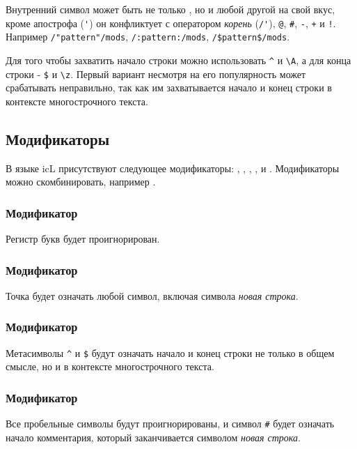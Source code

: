 \documentclass[a4paper, 14pt]{extarticle}
\begin{document}
Внутренний символ может быть не только \code{/}, но и любой другой на свой вкус, кроме апострофа (\lstinline|'|) он конфликтует с оператором {\it корень} (\lstinline|/'|), \lstinline|@|, \lstinline|#|, \lstinline|-|, \lstinline|+| и \lstinline|!|. Например  \lstinline|/"pattern"/mods|, \lstinline|/:pattern:/mods|, \lstinline|/$pattern$/mods|.

Для того чтобы захватить начало строки можно использовать \lstinline|^| и \lstinline|\A|, а для конца строки - \lstinline|$| и \lstinline|\z|. Первый вариант несмотря на его популярность может срабатывать неправильно, так как им захватывается начало и конец строки в контексте многострочного текста.

\subsection{Модификаторы}

В языке icL присутствуют следующее модификаторы: , , , ,  и . Модификаторы можно скомбинировать, например .

\subsubsection{Модификатор }

Регистр букв будет проигнорирован. 

\subsubsection{Модификатор }

Точка будет означать любой символ, включая символа {\it новая строка}.

\subsubsection{Модификатор }

Метасимволы \lstinline|^| и \lstinline|$| будут означать начало и конец строки не только в общем смысле, но и в контексте многострочного текста.

\subsubsection{Модификатор }

Все пробельные символы будут проигнорированы, и символ \lstinline|#| будет означать начало комментария, который заканчивается символом {\it новая строка}.
\end{document}

